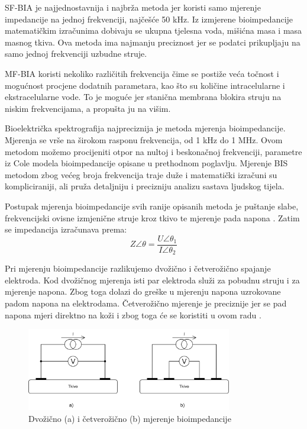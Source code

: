 \documentclass[../diplomski_rad.tex]{subfiles}
\begin{document}
SF-BIA je najjednostavnija i najbrža metoda jer koristi samo mjerenje impedancije na jednoj frekvenciji, najčešće 50 kHz. 
Iz izmjerene bioimpedancije matematičkim izračunima dobivaju se ukupna tjelesna voda, mišićna masa i masa masnog tkiva. 
Ova metoda ima najmanju preciznost jer se podatci prikupljaju na samo jednoj frekvenciji uzbudne struje.

MF-BIA koristi nekoliko različitih frekvencija čime se postiže veća točnost i mogućnost procjene dodatnih parametara, 
kao što su količine intracelularne i ekstracelularne vode. To je moguće jer stanična membrana blokira struju na niskim frekvencijama, 
a propušta ju na višim. 

Bioelektrička spektrografija najpreciznija je metoda mjerenja bioimpedancije. 
Mjerenja se vrše na širokom rasponu frekvencija, od 1 kHz do 1 MHz.  
Ovom metodom možemo procijeniti otpor na nultoj i beskonačnoj frekvenciji, parametre iz Cole modela bioimpedancije 
opisane u prethodnom poglavlju. 
Mjerenje BIS metodom zbog većeg broja frekvencija traje duže i matematički izračuni su kompliciraniji, 
ali pruža  detaljniju i precizniju analizu sastava ljudskog tijela.

Postupak mjerenja bioimpedancije svih ranije opisanih metoda je puštanje slabe, 
frekvencijski ovisne izmjenične struje kroz tkivo te mjerenje pada napona \cite{Bera2014}. 
Zatim se impedancija izračunava prema:
\begin{equation}
    \label{jed:prvajednadzba}
    Z\angle\theta = \frac{U\angle\theta_{1}}{I\angle\theta_{2}} 
\end{equation} 

Pri mjerenju bioimpedancije razlikujemo dvožično i četverožično spajanje elektroda. 
Kod dvožičnog mjerenja isti par elektroda služi za pobudnu struju i za mjerenje napona. 
Zbog toga dolazi do greške u mjerenju napona uzrokovane padom napona na elektrodama. 
Četverožično mjerenje je preciznije jer se pad napona mjeri direktno na koži i zbog toga će se koristiti u ovom radu \cite{Abasi2022}. 

\begin{figure}[htb]
    \centering
    \includegraphics[width=0.8\textwidth]{Figures/dvo_vs_cetverozicno.png} 
    \caption{Dvožično (a) i četverožično (b) mjerenje bioimpedancije}
    \label{slk:cole_model}
\end{figure}
\end{document}
